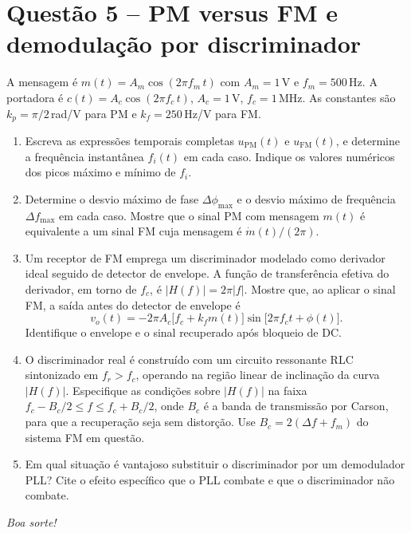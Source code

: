 \documentclass[11pt,a4paper]{article}
\begin{document}
\section*{Questão 5 -- PM versus FM e demodulação por discriminador}

A mensagem é $m(t) = A_m\cos(2\pi f_m\,t)$ com $A_m = 1$\,V e $f_m = 500$\,Hz. A portadora é $c(t) = A_c\cos(2\pi f_c\,t)$, $A_c = 1$\,V, $f_c = 1$\,MHz. As constantes são $k_p = \pi/2$\,rad/V para PM e $k_f = 250$\,Hz/V para FM.

\begin{enumerate}[label=\alph*)]
  \item Escreva as expressões temporais completas $u_{\text{PM}}(t)$ e $u_{\text{FM}}(t)$, e determine a frequência instantânea $f_i(t)$ em cada caso. Indique os valores numéricos dos picos máximo e mínimo de $f_i$.
  \item Determine o desvio máximo de fase $\Delta\phi_{\max}$ e o desvio máximo de frequência $\Delta f_{\max}$ em cada caso. Mostre que o sinal PM com mensagem $m(t)$ é equivalente a um sinal FM cuja mensagem é $\dot m(t)/(2\pi)$.
  \item Um receptor de FM emprega um discriminador modelado como derivador ideal seguido de detector de envelope. A função de transferência efetiva do derivador, em torno de $f_c$, é $|H(f)| = 2\pi|f|$. Mostre que, ao aplicar o sinal FM, a saída antes do detector de envelope é
  \[
    v_o(t) = -2\pi A_c\big[f_c + k_f m(t)\big]\sin\!\big[2\pi f_c t + \phi(t)\big].
  \]
  Identifique o envelope e o sinal recuperado após bloqueio de DC.
  \item O discriminador real é construído com um circuito ressonante RLC sintonizado em $f_r > f_c$, operando na região linear de inclinação da curva $|H(f)|$. Especifique as condições sobre $|H(f)|$ na faixa $f_c - B_c/2 \le f \le f_c + B_c/2$, onde $B_c$ é a banda de transmissão por Carson, para que a recuperação seja sem distorção. Use $B_c = 2(\Delta f + f_m)$ do sistema FM em questão.
  \item Em qual situação é vantajoso substituir o discriminador por um demodulador PLL? Cite o efeito específico que o PLL combate e que o discriminador não combate.
\end{enumerate}

\vfill
\begin{center}
  \small\textit{Boa sorte!}
\end{center}
\end{document}
